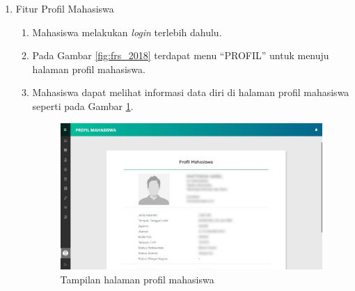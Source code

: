 \begin{enumerate}
	\item Fitur Profil Mahasiswa
	\begin{enumerate}
		\item Mahasiswa melakukan \textit{login} terlebih dahulu. 
		\item Pada Gambar \ref{fig:frs_2018} terdapat menu ``PROFIL'' untuk menuju halaman profil mahasiswa. 
		\item Mahasiswa dapat melihat informasi data diri di halaman profil mahasiswa seperti pada Gambar \ref{fig:profil_2018}.
		\begin{figure}[H]
			\centering
			\includegraphics[scale=0.7]{Gambar/profil2018.jpg}
			\caption{Tampilan halaman profil mahasiswa} 
			\label{fig:profil_2018}
		\end{figure}
	\end{enumerate}
	

\end{enumerate}
